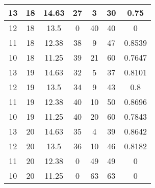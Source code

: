 \documentclass[letterpaper, 12pt]{article}
\begin{document}
\begin{longtable}{|c|c|c|c|c|c|c|}
\hline
13 & 18 & 14.63 & 27 & 3 & 30 & 0.75 \\
\hline
12 & 18 & 13.5 & 0 & 40 & 40 & 0 \\
\hline
11 & 18 & 12.38 & 38 & 9 & 47 & 0.8539 \\
\hline
10 & 18 & 11.25 & 39 & 21 & 60 & 0.7647 \\
\hline
13 & 19 & 14.63 & 32 & 5 & 37 & 0.8101 \\
\hline
12 & 19 & 13.5 & 34 & 9 & 43 & 0.8 \\
\hline
11 & 19 & 12.38 & 40 & 10 & 50 & 0.8696 \\
\hline
10 & 19 & 11.25 & 40 & 20 & 60 & 0.7843 \\
\hline
13 & 20 & 14.63 & 35 & 4 & 39 & 0.8642 \\
\hline
12 & 20 & 13.5 & 36 & 10 & 46 & 0.8182 \\
\hline
11 & 20 & 12.38 & 0 & 49 & 49 & 0 \\
\hline
10 & 20 & 11.25 & 0 & 63 & 63 & 0 \\
\hline
\end{longtable}
\end{document}
